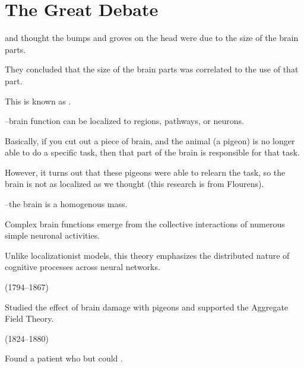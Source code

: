\section{The Great Debate}

\begin{coloredlist}
    \item {} and  thought the bumps and groves on the head were due to the size of the brain parts.
    \item They concluded that the size of the brain parts was correlated to the use of that part.
    \item This is known as .
    \item {}--brain function can be localized to regions, pathways, or neurons.
    \begin{coloredlist}
        \item Basically, if you cut out a piece of brain, and the animal (a pigeon) is no longer able to do a specific task, then that part of the brain is responsible for that task.
        \item However, it turns out that these pigeons were able to relearn the task, so the brain is not as localized as we thought (this research is from Flourens).
    \end{coloredlist}
    \item {}--the brain is a homogenous mass.
    \begin{coloredlist}
        \item Complex brain functions emerge from the collective interactions of numerous simple neuronal activities.
        \item Unlike localizationist models, this theory emphasizes the distributed nature of cognitive processes across neural networks.
    \end{coloredlist}
    \item {} (1794--1867)
    \begin{coloredlist}
        \item Studied the effect of brain damage with pigeons and supported the Aggregate Field Theory.
    \end{coloredlist}
    \item {} (1824--1880)
    \begin{coloredlist}
        \item Found a patient who  but could .

\end{coloredlist}
\end{coloredlist}
